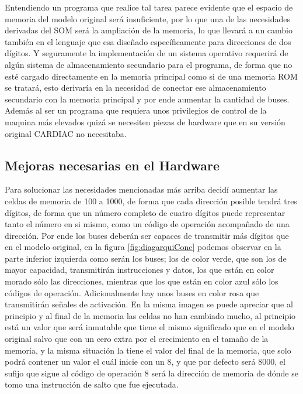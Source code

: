 \documentclass[letterpaper,12pt,oneside]{book}
\begin{document}
		Entendiendo un programa que realice tal tarea parece evidente que el espacio de memoria del modelo original será insuficiente, por lo que una de las necesidades
		derivadas del SOM será la ampliación de la memoria, lo que llevará a un cambio también en el lenguaje que esa diseñado específicamente para direcciones de dos 
		dígitos. Y seguramente la implementación de un sistema operativo requerirá de algún sistema de almacenamiento secundario para el programa, de forma que no esté
		cargado directamente en la memoria principal como si de una memoria ROM se tratará, esto derivaría en la necesidad de conectar ese almacenamiento secundario
		con la memoria principal y por ende aumentar la cantidad de buses. Además al ser un programa que requiera unos privilegios de control de la maquina más elevados
		quizá se necesiten piezas de hardware que en su versión original CARDIAC no necesitaba.
		
		\subsection{Mejoras necesarias en el Hardware}
		
		Para solucionar las necesidades mencionadas más arriba decidí aumentar las celdas de memoria de 100 a 1000, de forma que cada dirección posible tendrá
		tres dígitos, de forma que un número completo de cuatro dígitos	puede representar tanto el número en si mismo, como un código de operación acompañado de una
		dirección. Por ende los buses deberán ser capaces de transmitir más dígitos que en el modelo original, en la figura \ref{fig:diagarquiConc} 
		podemos observar
		en la parte inferior izquierda como serán los buses; los de color verde, que son los de mayor capacidad, transmitirán instrucciones y datos, los
		que están en color morado sólo las direcciones, mientras que los que están en color azul sólo los códigos de operación. Adicionalmente hay unos buses
		en color rosa que transmitirán señales de activación. En la misma imagen se puede apreciar que al principio y al final de la memoria las celdas no han cambiado
		mucho, al principio está un valor que será inmutable que tiene el mismo significado que en el modelo original salvo que con un cero extra por el crecimiento
		en el tamaño de la memoria, y la misma situación la tiene el valor del final de la memoria, que solo podrá contener un valor el cuál inicie con un $8$, y
		que por defecto será $8000$, el sufijo que sigue al código de operación $8$ será la dirección de memoria de dónde se tomo una instrucción de salto 
		que fue ejecutada.
				
\end{document}
